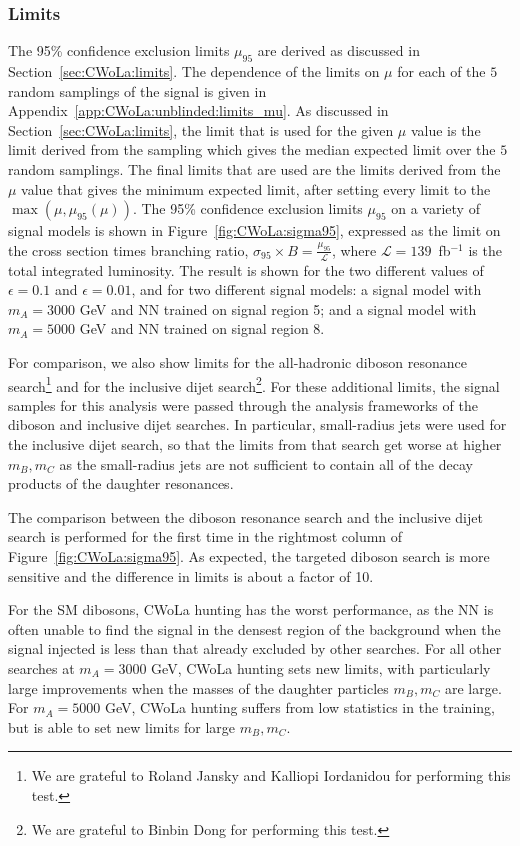 \subsubsection{Limits}
\label{sec:CWoLa:unblinded:limits}
The 95\% confidence exclusion limits $\mu_{95}$ are derived as discussed in Section~\ref{sec:CWoLa:limits}. The dependence of the limits on $\mu$ for each of the $5$ random samplings of the signal is given in Appendix~\ref{app:CWoLa:unblinded:limits_mu}.
As discussed in Section~\ref{sec:CWoLa:limits}, the limit that is used for the given $\mu$ value is the limit derived from the sampling which gives the median expected limit over the $5$ random samplings.
The final limits that are used are the limits derived from the $\mu$ value that gives the minimum expected limit, after setting every limit to the $\max(\mu,\mu_{95}(\mu))$. 
The 95\% confidence exclusion limits $\mu_{95}$ on a variety of signal models is shown in Figure~\ref{fig:CWoLa:sigma95}, expressed as the limit on the cross section times branching ratio, $\sigma_{95}\times B = \frac{\mu_{95}}{\mathcal{L}}$, where $\mathcal{L} = 139$~fb$^{-1}$ is the total integrated luminosity.
The result is shown for the two different values of $\epsilon=0.1$ and $\epsilon=0.01$, and for two different signal models: a signal model with $m_A=3000$ GeV and NN trained on signal region 5; and a signal model with $m_A=5000$ GeV and NN trained on signal region 8.

For comparison, we also show limits for the all-hadronic diboson resonance search\footnote{We are grateful to Roland Jansky and Kalliopi Iordanidou for performing this test.} and for the inclusive dijet search\footnote{We are grateful to Binbin Dong for performing this test.}.
For these additional limits, the signal samples for this analysis were passed through the analysis frameworks of the diboson and inclusive dijet searches.
In particular, small-radius jets were used for the inclusive dijet search, so that the limits from that search get worse at higher $m_B,m_C$ as the small-radius jets are not sufficient to contain all of the decay products of the daughter resonances.

The comparison between the diboson resonance search and the inclusive dijet search is performed for the first time in the rightmost column of Figure~\ref{fig:CWoLa:sigma95}.
As expected, the targeted diboson search is more sensitive and the difference in limits is about a factor of 10.

For the SM dibosons, CWoLa hunting has the worst performance, as the NN is often unable to find the signal in the densest region of the background when the signal injected is less than that already excluded by other searches.
For all other searches at $m_A=3000$ GeV, CWoLa hunting sets new limits, with particularly large improvements when the masses of the daughter particles $m_B,m_C$ are large.
For $m_A=5000$ GeV, CWoLa hunting suffers from low statistics in the training, but is able to set new limits for large $m_B,m_C$.

